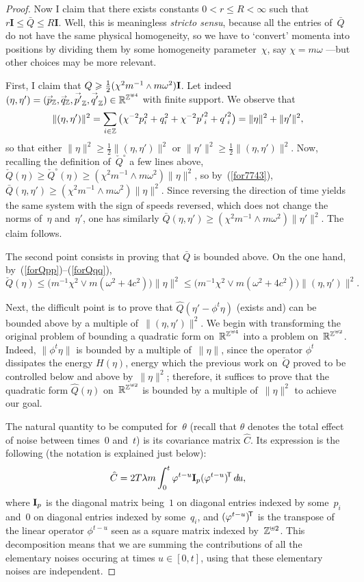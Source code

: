 \begin{proof}
Now I claim that there exists
constants $0<r\leq R<\infty$ such that
$r\mathbf{I} \leq \bar{Q} \leq R\mathbf{I}$.
Well, this is meaningless \emph{stricto sensu}, because all the entries of~$\bar{Q}$
do not have the same physical homogeneity,
so we have to `convert' momenta into positions by dividing them
by some homogeneity parameter~$\chi$, say $\chi = m\omega$
—but other choices may be more relevant.

First, I claim that $\bar{Q} \geq \frac{1}{2}(\chi^2 m^{-1}\wedge m\omega^2) \mbf{I}$.
Let indeed $(\eta,\eta') = (\vec{p}_{\ZZ},\vec{q}_{\ZZ},\vec{p'}_{\ZZ},\vec{q'}_{\ZZ})
\in \RR^{\ZZ^{\uplus4}}$ with finite support.
We observe that
\[ \|(\eta,\eta')\|^2 = \sum_{i\in\ZZ} \big(\chi^{-2}p_i^2+q_i^2+\chi^{-2}{p'}_i^2+{q'}_i^2\big)
= \| \eta \|^2 + \| \eta' \|^2 ,\]
so that either $\|\eta\|^2 \geq \frac{1}{2} \|(\eta,\eta')\|^2$
or $\|\eta'\|^2 \geq \frac{1}{2} \|(\eta,\eta')\|^2$.
Now, recalling the definition of~$\check{Q}^\circ$ a few lines above,
$\check{Q}(\eta) \geq \check{Q}^\circ(\eta) \geq (\chi^2 m^{-1}\wedge m\omega^2) \|\eta\|^2$,
so by~(\ref{for7743}), $\bar{Q}(\eta,\eta') \geq (\chi^2 m^{-1}\wedge m\omega^2) \|\eta\|^2$.
Since reversing the direction of time yields the same system with the sign of speeds reversed, which does not change the norms of~$\eta$ and~$\eta'$,
one has similarly $\bar{Q}(\eta,\eta') \geq (\chi^2 m^{-1}\wedge m\omega^2) \|\eta'\|^2$.
The claim follows.

The second point consists in proving that $\bar{Q}$ is bounded above.
On the one hand, by~(\ref{forQpp})--(\ref{forQqq}),
\[ \check{Q}(\eta) \leq \big(m^{-1}\chi^2\vee m(\omega^2+4c^2)\big) \|\eta\|^2
\leq \big(m^{-1}\chi^2\vee m(\omega^2+4c^2)\big) \|(\eta,\eta')\|^2 .\]

Next, the difficult point is to prove that $\hat{Q}(\eta'-\phi^{t}\eta)$
(exists and) can be bounded above by a multiple of~$\|(\eta,\eta')\|^2$.
We begin with transforming the original problem
of bounding a quadratic form on~$\mathbb{R}^{\mathbb{Z}^{\uplus4}}$
into a problem on~$\mathbb{R}^{\mathbb{Z}^{\uplus2}}$.
Indeed, $\|\phi^t\eta\|$ is bounded by a multiple of~$\|\eta\|$,
since the operator $\phi^t$ dissipates the energy $H(\eta)$,
energy which the previous work on~$\check Q$
proved to be controlled below and above by~$\|\eta\|^2$;
therefore, it suffices to prove that the quadratic form $\hat{Q}(\eta)$ on~$\mathbb{R}^{\mathbb{Z}^{\uplus2}}$
is bounded by a multiple of~$\|\eta\|^2$ to achieve our goal.

The natural quantity to be computed for~$\theta$
(recall that $\theta$ denotes the total effect of noise between times~$0$ and~$t$)
is its covariance matrix $\hat{C}$.
Its expression is the following (the notation is explained just below):
\[\label{for5483} \hat{C} = 2T\lambda m \int_0^{t} \phi^{t-u} \mbf{I}_p \T{(\phi^{t-u})} \,\dx{u} ,\]
where $\mathbf{I}_p$ is the diagonal matrix being~$1$ on diagonal entries indexed by some~$p_i$
and~$0$ on diagonal entries indexed by some~$q_i$,
and $(\varphi^{t-u})^{\mathsf{\!T}}$ is the transpose of the linear operator $\phi^{t-u}$
seen as a square matrix indexed by~$\mathbb{Z}^{\uplus2}$.
This decomposition means that we are summing the contributions
of all the elementary noises occuring at times $u \in [0,t]$,
using that these elementary noises are independent.


\end{proof}
